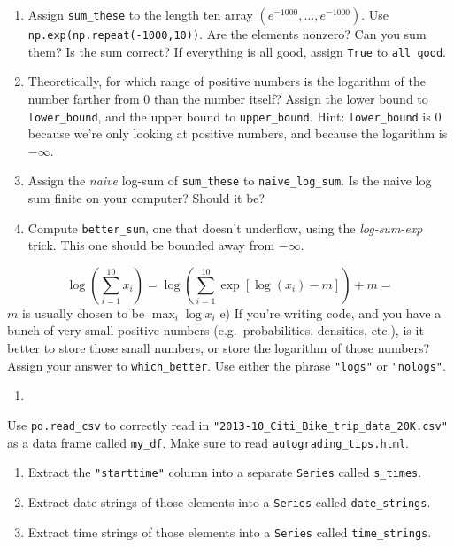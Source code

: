 \documentclass[12pt,krantz2]{krantz}
\providecommand{\tightlist}{%
  \setlength{\itemsep}{0pt}\setlength{\parskip}{0pt}}
\begin{document}
\begin{enumerate}
\def\labelenumi{\alph{enumi})}
\tightlist
\item
  Assign \texttt{sum\_these} to the length ten array \((e^{-1000}, \ldots, e^{-1000})\). Use \texttt{np.exp(np.repeat(-1000,10))}. Are the elements nonzero? Can you sum them? Is the sum correct? If everything is all good, assign \texttt{True} to \texttt{all\_good}.
\item
  Theoretically, for which range of positive numbers is the logarithm of the number farther from \(0\) than the number itself? Assign the lower bound to \texttt{lower\_bound}, and the upper bound to \texttt{upper\_bound}. Hint: \texttt{lower\_bound} is \(0\) because we're only looking at positive numbers, and because the logarithm is \(-\infty\).
\item
  Assign the \emph{naive} log-sum of \texttt{sum\_these} to \texttt{naive\_log\_sum}. Is the naive log sum finite on your computer? Should it be?
\item
  Compute \texttt{better\_sum}, one that doesn't underflow, using the \emph{log-sum-exp} trick. This one should be bounded away from \(-\infty\).
\end{enumerate}

\[
  \log\left( \sum_{i=1}^{10} x_i \right) = \log\left( \sum_{i=1}^{10} \exp[ \log(x_i) - m] \right) + m = 
  \]
\(m\) is usually chosen to be \(\max_i \log x_i\)
e) If you're writing code, and you have a bunch of very small positive numbers (e.g.~probabilities, densities, etc.), is it better to store those small numbers, or store the logarithm of those numbers? Assign your answer to \texttt{which\_better}. Use either the phrase \texttt{"logs"} or \texttt{"nologs"}.

\begin{enumerate}
\def\labelenumi{\arabic{enumi}.}
\setcounter{enumi}{4}
\item
\end{enumerate}

Use \texttt{pd.read\_csv} to correctly read in \texttt{"2013-10\_Citi\_Bike\_trip\_data\_20K.csv"} as a data frame called \texttt{my\_df}. Make sure to read \texttt{autograding\_tips.html}.

\begin{enumerate}
\def\labelenumi{\alph{enumi})}
\tightlist
\item
  Extract the \texttt{"starttime"} column into a separate \texttt{Series} called \texttt{s\_times}.
\item
  Extract date strings of those elements into a \texttt{Series} called \texttt{date\_strings}.
\item
  Extract time strings of those elements into a \texttt{Series} called \texttt{time\_strings}.
\end{enumerate}
\end{document}
